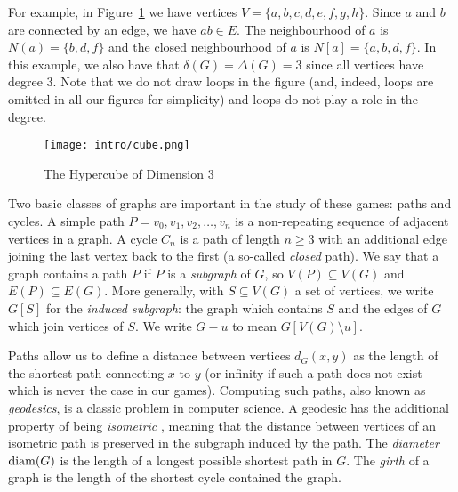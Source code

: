 For example, in Figure~\ref{fig:hyper-cube} we have vertices $V = \{ a, b, c, d, e, f, g, h \}$.
Since $a$ and $b$ are connected by an edge, we have $ab \in E$.
The neighbourhood of $a$ is $N(a) = \{ b,d,f \}$ and the closed neighbourhood of $a$ is
$N[a] = \{ a, b, d, f \}$. In this example, we also have that $\delta(G) = \Delta(G) = 3$ since all vertices have degree 3. Note that we do not draw loops in the figure (and, indeed, loops are omitted in all our figures for simplicity) and loops do not play a role in the degree.

\begin{figure}
\centering
\texttt{[image: intro/cube.png]}
\caption{The Hypercube of Dimension 3 \label{fig:hyper-cube}}
\end{figure}

Two basic classes of graphs are important in the study of these games: paths and cycles.
A simple path $P = v_0, v_1, v_2, \dots , v_n$ is a non-repeating sequence of
adjacent vertices in a graph. A cycle $C_n$ is a path of length $n \geq 3$ with an additional edge joining the last vertex back to the first (a so-called \textit{closed} path).
We say that a graph contains a path $P$ if $P$ is a \textit{subgraph} of $G$, so $V(P) \subseteq V(G)$ and $E(P) \subseteq E(G)$. More generally, with $S \subseteq V(G)$ a set of vertices, we write $G[S]$ for the \textit{induced subgraph}: the graph which contains $S$ and the edges of $G$ which join vertices of $S$. We write $G - u$ to mean $G[V(G) \setminus u]$.

Paths allow us to define a distance between vertices $d_G(x,y)$ as the length of the shortest path connecting $x$ to $y$ (or infinity if such a path does not exist which is never the case in our games). Computing such paths, also known as \textit{geodesics}, is a classic problem in computer science.
A geodesic has the additional property of being \textit{isometric} \cite{pan2006isometric}, meaning that the distance between vertices of an isometric path is preserved in the subgraph induced by the path.
The \textit{diameter} $\operatorname{diam}(G)$ is the length of a longest possible shortest path in $G$. The \textit{girth} of a graph is the length of the shortest cycle contained the graph.

